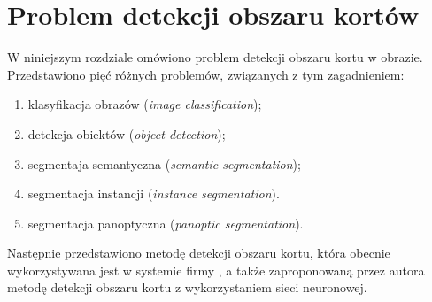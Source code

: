 \chapter{Problem detekcji obszaru kortów}

W niniejszym rozdziale omówiono problem detekcji obszaru kortu w obrazie.
Przedstawiono pięć różnych problemów, związanych z tym zagadnieniem:
\begin{enumerate}
  \item klasyfikacja obrazów (\textit{image classification});
  \item detekcja obiektów (\textit{object detection});
  \item segmentaja semantyczna (\textit{semantic segmentation});
  \item segmentacja instancji (\textit{instance segmentation}).
  \item segmentacja panoptyczna (\textit{panoptic segmentation}).
\end{enumerate}
Następnie przedstawiono metodę detekcji obszaru kortu, która obecnie wykorzystywana jest w systemie firmy \blue{}, a także zaproponowaną przez autora metodę detekcji obszaru kortu z wykorzystaniem sieci neuronowej.
